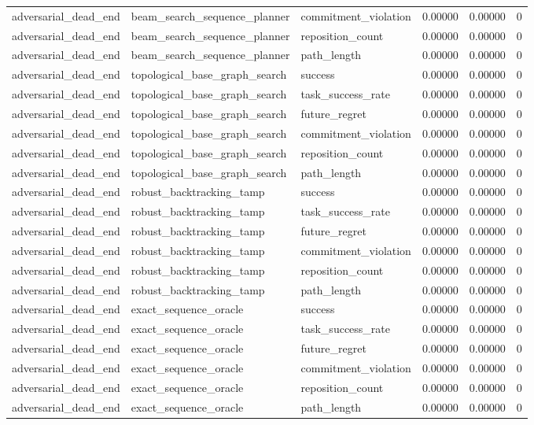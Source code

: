 \documentclass{article}
\begin{document}
\begin{table}[tbp]
{\begin{tabular}{llllll}
adversarial\_dead\_end & beam\_search\_sequence\_planner & commitment\_violation & 0.00000 & 0.00000 & 0 \\
adversarial\_dead\_end & beam\_search\_sequence\_planner & reposition\_count & 0.00000 & 0.00000 & 0 \\
adversarial\_dead\_end & beam\_search\_sequence\_planner & path\_length & 0.00000 & 0.00000 & 0 \\
adversarial\_dead\_end & topological\_base\_graph\_search & success & 0.00000 & 0.00000 & 0 \\
adversarial\_dead\_end & topological\_base\_graph\_search & task\_success\_rate & 0.00000 & 0.00000 & 0 \\
adversarial\_dead\_end & topological\_base\_graph\_search & future\_regret & 0.00000 & 0.00000 & 0 \\
adversarial\_dead\_end & topological\_base\_graph\_search & commitment\_violation & 0.00000 & 0.00000 & 0 \\
adversarial\_dead\_end & topological\_base\_graph\_search & reposition\_count & 0.00000 & 0.00000 & 0 \\
adversarial\_dead\_end & topological\_base\_graph\_search & path\_length & 0.00000 & 0.00000 & 0 \\
adversarial\_dead\_end & robust\_backtracking\_tamp & success & 0.00000 & 0.00000 & 0 \\
adversarial\_dead\_end & robust\_backtracking\_tamp & task\_success\_rate & 0.00000 & 0.00000 & 0 \\
adversarial\_dead\_end & robust\_backtracking\_tamp & future\_regret & 0.00000 & 0.00000 & 0 \\
adversarial\_dead\_end & robust\_backtracking\_tamp & commitment\_violation & 0.00000 & 0.00000 & 0 \\
adversarial\_dead\_end & robust\_backtracking\_tamp & reposition\_count & 0.00000 & 0.00000 & 0 \\
adversarial\_dead\_end & robust\_backtracking\_tamp & path\_length & 0.00000 & 0.00000 & 0 \\
adversarial\_dead\_end & exact\_sequence\_oracle & success & 0.00000 & 0.00000 & 0 \\
adversarial\_dead\_end & exact\_sequence\_oracle & task\_success\_rate & 0.00000 & 0.00000 & 0 \\
adversarial\_dead\_end & exact\_sequence\_oracle & future\_regret & 0.00000 & 0.00000 & 0 \\
adversarial\_dead\_end & exact\_sequence\_oracle & commitment\_violation & 0.00000 & 0.00000 & 0 \\
adversarial\_dead\_end & exact\_sequence\_oracle & reposition\_count & 0.00000 & 0.00000 & 0 \\
adversarial\_dead\_end & exact\_sequence\_oracle & path\_length & 0.00000 & 0.00000 & 0 \\
\bottomrule
\end{tabular}
}
\end{table}
\end{document}
